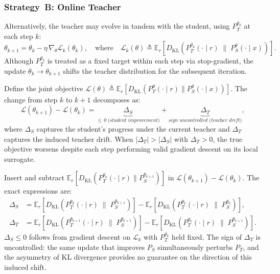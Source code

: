 \documentclass[]{jingdong}
\begin{document}
\subsubsection{Strategy~B: Online Teacher}

Alternatively, the teacher may evolve in tandem with the student, using $P_T^{\theta_k}$ at each step $k$:
\begin{equation}
    \theta_{k+1} = \theta_k - \eta\, \nabla_\theta \mathcal{L}_k(\theta_k), \quad \text{where} \quad \mathcal{L}_k(\theta) \triangleq \mathbb{E}_r\!\left[D_{\mathrm{KL}}\!\left(P_T^{\theta_k}(\cdot \mid r) \;\|\; P_S^\theta(\cdot \mid x)\right)\right].
\end{equation}
Although $P_T^{\theta_k}$ is treated as a fixed target within each step via stop-gradient, the update $\theta_k \to \theta_{k+1}$ shifts the teacher distribution for the subsequent iteration.

\begin{theorem}
\label{thm:instability}
Define the joint objective $\mathcal{L}(\theta) \triangleq \mathbb{E}_r[D_{\mathrm{KL}}(P_T^\theta(\cdot \mid r) \| P_S^\theta(\cdot \mid x))]$. The change from step $k$ to $k{+}1$ decomposes as:
\begin{equation}
    \mathcal{L}(\theta_{k+1}) - \mathcal{L}(\theta_k) = \underbrace{\Delta_S}_{\leq\, 0\;\textit{(student improvement)}} + \underbrace{\Delta_T}_{\textit{sign uncontrolled (teacher drift)}},
    \label{eq:delta-decomp}
\end{equation}
where $\Delta_S$ captures the student's progress under the current teacher and $\Delta_T$ captures the induced teacher drift. When $|\Delta_T| > |\Delta_S|$ with $\Delta_T > 0$, the true objective worsens despite each step performing valid gradient descent on its local surrogate.
\end{theorem}

Insert and subtract $\mathbb{E}_r[D_{\mathrm{KL}}(P_T^{\theta_k}(\cdot \mid r) \| P_S^{\theta_{k+1}})]$ in $\mathcal{L}(\theta_{k+1}) - \mathcal{L}(\theta_k)$. The exact expressions are:
\begin{align}
    \Delta_S &= \mathbb{E}_r\!\left[D_{\mathrm{KL}}\!\left(P_T^{\theta_k}(\cdot \mid r) \;\|\; P_S^{\theta_{k+1}}\right)\right] - \mathbb{E}_r\!\left[D_{\mathrm{KL}}\!\left(P_T^{\theta_k}(\cdot \mid r) \;\|\; P_S^{\theta_k}\right)\right], \\
    \Delta_T &= \mathbb{E}_r\!\left[D_{\mathrm{KL}}\!\left(P_T^{\theta_{k+1}}(\cdot \mid r) \;\|\; P_S^{\theta_{k+1}}\right)\right] - \mathbb{E}_r\!\left[D_{\mathrm{KL}}\!\left(P_T^{\theta_k}(\cdot \mid r) \;\|\; P_S^{\theta_{k+1}}\right)\right].
\end{align}
$\Delta_S \leq 0$ follows from gradient descent on $\mathcal{L}_k$ with $P_T^{\theta_k}$ held fixed. The sign of $\Delta_T$ is uncontrolled: the same update that improves $P_S$ simultaneously perturbs $P_T$, and the asymmetry of KL divergence provides no guarantee on the direction of this induced shift.
\end{document}

